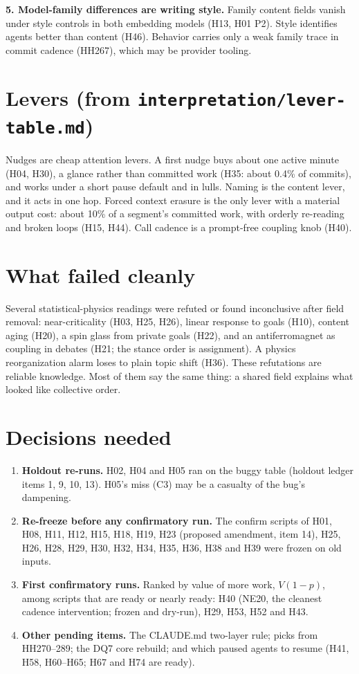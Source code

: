 \documentclass[aps,pre,reprint,10pt,nofootinbib]{revtex4-2}
\begin{document}
\textbf{5. Model-family differences are writing style.} Family content fields vanish under style controls in both embedding models (H13, H01 P2). Style identifies agents better than content (H46). Behavior carries only a weak family trace in commit cadence (HH267), which may be provider tooling.

\section{Levers (from \texttt{interpretation/lever-table.md})}
Nudges are cheap attention levers. A first nudge buys about one active minute (H04, H30), a glance rather than committed work (H35: about 0.4\% of commits), and works under a short pause default and in lulls. Naming is the content lever, and it acts in one hop. Forced context erasure is the only lever with a material output cost: about 10\% of a segment's committed work, with orderly re-reading and broken loops (H15, H44). Call cadence is a prompt-free coupling knob (H40).

\section{What failed cleanly}
Several statistical-physics readings were refuted or found inconclusive after field removal: near-criticality (H03, H25, H26), linear response to goals (H10), content aging (H20), a spin glass from private goals (H22), and an antiferromagnet as coupling in debates (H21; the stance order is assignment). A physics reorganization alarm loses to plain topic shift (H36). These refutations are reliable knowledge. Most of them say the same thing: a shared field explains what looked like collective order.

\section{Decisions needed}
\begin{enumerate}
\item \textbf{Holdout re-runs.} H02, H04 and H05 ran on the buggy table (holdout ledger items 1, 9, 10, 13). H05's miss (C3) may be a casualty of the bug's dampening.
\item \textbf{Re-freeze before any confirmatory run.} The confirm scripts of H01, H08, H11, H12, H15, H18, H19, H23 (proposed amendment, item 14), H25, H26, H28, H29, H30, H32, H34, H35, H36, H38 and H39 were frozen on old inputs.
\item \textbf{First confirmatory runs.} Ranked by value of more work, $V(1-p)$, among scripts that are ready or nearly ready: H40 (NE20, the cleanest cadence intervention; frozen and dry-run), H29, H53, H52 and H43.
\item \textbf{Other pending items.} The CLAUDE.md two-layer rule; picks from HH270--289; the DQ7 core rebuild; and which paused agents to resume (H41, H58, H60--H65; H67 and H74 are ready).
\end{enumerate}
\end{document}
